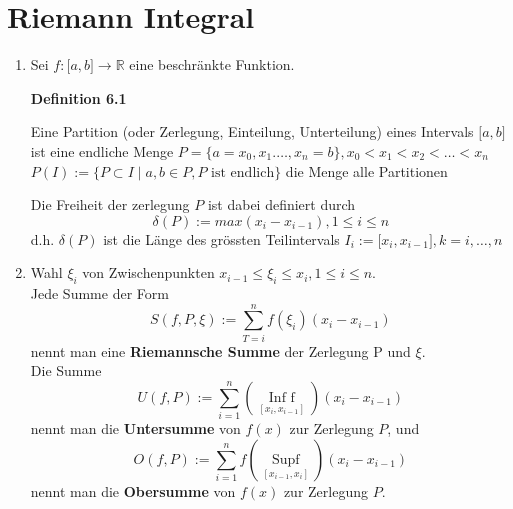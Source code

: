\section{Riemann Integral}
\begin{enumerate}
\item Sei $f: \lbrack a,b\rbrack\rightarrow\mathbb{R}$ eine beschränkte Funktion.\\

\begin{framed}
\centerline{\textbf{Definition 6.1}}
\noindent Eine Partition (oder Zerlegung, Einteilung, Unterteilung) eines Intervals $\lbrack a,b\rbrack$ ist eine endliche Menge $P=\{a=x_0,x_1.\dots,x_n=b \}, x_0 < x_1 < x_2 < \dots < x_n$ \\
$P(I):=\{P\subset I \mid a,b\in P, P \text{ ist endlich}\}$ die Menge alle Partitionen \begin{center}
\end{center}
\end{framed}

Die Freiheit der zerlegung $P$ ist dabei definiert durch $$\delta (P):=max(x_i - x_{i-1}), 1\leq i \leq n$$ d.h. $\delta (P)$ ist die Länge des grössten Teilintervals $I_i:=\lbrack x_i,x_{i-1}\rbrack , k=i,\dots,n$

\item Wahl $\xi_i$ von Zwischenpunkten  $x_{i-1} \leq \xi_i  \leq x_i, 1\leq i \leq n$.\\
Jede Summe der Form $$S(f,P,\xi):=\sum\limits_{T = i}^n {f({\xi _i})} ({x_i} - {x_{i - 1}})$$ nennt man eine \textbf{Riemannsche Summe} der Zerlegung P und $\xi$.\\
Die Summe $$U(f,P):=\sum\limits_{i = 1}^n {(\mathop {{\text{Inf }}f}\limits_{[{x_i},{x_{i - 1}}]} )} ({x_i} - {x_{i - 1}})$$ nennt man die \textbf{Untersumme} von $f(x)$ zur Zerlegung $P$, und $$O(f,P):=\sum\limits_{i = 1}^n {f(\mathop {{\text{Sup}}f}\limits_{[{x_{i - 1}},{x_{i}}]} )} ({x_i} - {x_{i - 1}})$$ nennt man die \textbf{Obersumme} von $f(x)$ zur Zerlegung $P$.


\end{enumerate}
